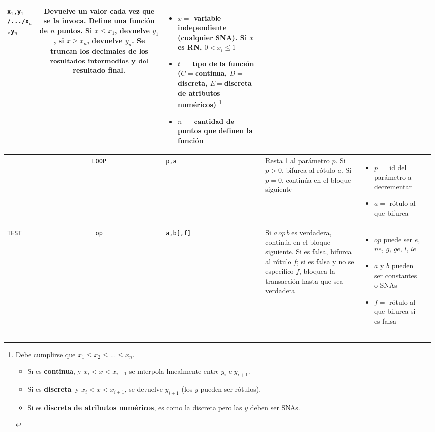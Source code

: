 \documentclass{article}
\providecommand{\tabularnewline}{\\}
\begin{document}
\begin{longtable}{|lc>{\raggedright}p{}|>{\raggedright}p{}|>{\raggedright}p{}|>{\raggedright}p{}|}
\texttt{x$_{1}$,y$_{1}$/.../x$_{n}$,y$_{n}$} &
Devuelve un valor cada vez que se la invoca. Define una función de $n$ puntos.
Si $x \leq x_{1}$, devuelve $y_{1}$, si $x \geq x_{n}$, devuelve $y_{n}$.
Se truncan los decimales de los resultados intermedios y del resultado final. &
\begin{itemize}
  \item $x=$ variable independiente (cualquier SNA). Si $x$ es RN, $0<x_{i}\leq1$
  \item $t=$ tipo de la función ($C=$continua, $D=$discreta,
    $E=$discreta de atributos numéricos)
    \footnote{
      Debe cumplirse que $x_{1}\leq x_{2}\leq...\leq x_{n}$.
      \begin{itemize}
        \item Si es \textbf{continua}, y $x_{i}<x<x_{i+1}$ se interpola
          linealmente entre $y_{i}$ e $y_{i+1}$.
        \item Si es \textbf{discreta}, y $x_{i}<x<x_{i+1}$, se devuelve
          $y_{i+1}$ (los $y$ pueden ser rótulos).
        \item Si es \textbf{discreta de atributos numéricos}, es como
          la discreta pero las $y$ deben ser SNAs.
      \end{itemize}
    }
  \item $n=$ cantidad de puntos que definen la función
\end{itemize} & \tabularnewline

\hline
& \texttt{LOOP} & \texttt{p,a} &
Resta 1 al parámetro $p$. Si $p>0$, bifurca al rótulo $a$. Si $p=0$, continúa en el bloque siguiente &
\begin{itemize}
  \item $p=$ id del parámetro a decrementar
  \item $a=$ rótulo al que bifurca
\end{itemize} & \tabularnewline

\hline
\texttt{TEST} & \texttt{op} & \texttt{a,b[,f]} &
Si $a \, op \, b$ es verdadera, continúa en el bloque siguiente.
Si es falsa, bifurca al rótulo $f$; si es falsa y no se especifico $f$,
bloquea la transacción hasta que sea verdadera &
\begin{itemize}
  \item $op$ puede ser $e$, $ne$, $g$, $ge$, $l$, $le$
  \item $a$ y $b$ pueden ser constantes o SNAs
  \item $f=$ rótulo al que bifurca si es falsa
\end{itemize} & \tabularnewline


\end{longtable}
\end{document}

